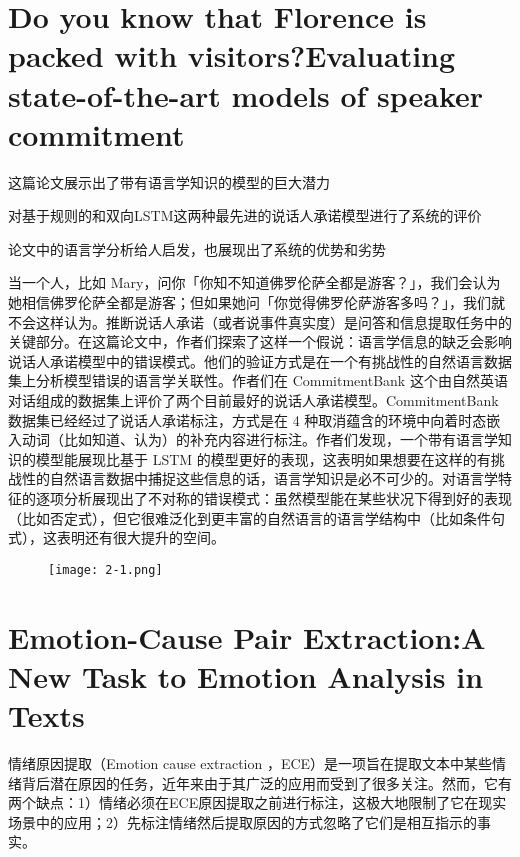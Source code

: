 \documentclass[a4paper,UTF8]{article}
\numberwithin{equation}{section}
\begin{document}
\newpage
\section{Do you know that Florence is packed with visitors?Evaluating state-of-the-art models of speaker commitment}
这篇论文展示出了带有语言学知识的模型的巨大潜力

对基于规则的和双向LSTM这两种最先进的说话人承诺模型进行了系统的评价

论文中的语言学分析给人启发，也展现出了系统的优势和劣势

当一个人，比如 Mary，问你「你知不知道佛罗伦萨全都是游客？」，我们会认为她相信佛罗伦萨全都是游客；但如果她问「你觉得佛罗伦萨游客多吗？」，我们就不会这样认为。推断说话人承诺（或者说事件真实度）是问答和信息提取任务中的关键部分。在这篇论文中，作者们探索了这样一个假说：语言学信息的缺乏会影响说话人承诺模型中的错误模式。他们的验证方式是在一个有挑战性的自然语言数据集上分析模型错误的语言学关联性。作者们在 CommitmentBank 这个由自然英语对话组成的数据集上评价了两个目前最好的说话人承诺模型。CommitmentBank 数据集已经经过了说话人承诺标注，方式是在 4 种取消蕴含的环境中向着时态嵌入动词（比如知道、认为）的补充内容进行标注。作者们发现，一个带有语言学知识的模型能展现比基于 LSTM 的模型更好的表现，这表明如果想要在这样的有挑战性的自然语言数据中捕捉这些信息的话，语言学知识是必不可少的。对语言学特征的逐项分析展现出了不对称的错误模式：虽然模型能在某些状况下得到好的表现（比如否定式），但它很难泛化到更丰富的自然语言的语言学结构中（比如条件句式），这表明还有很大提升的空间。

\begin{figure}[H]
	\centering
	\texttt{[image: 2-1.png]}
\end{figure}

\newpage
\section{Emotion-Cause Pair Extraction:A New Task to Emotion Analysis in Texts}
情绪原因提取（Emotion cause extraction ，ECE）是一项旨在提取文本中某些情绪背后潜在原因的任务，近年来由于其广泛的应用而受到了很多关注。然而，它有两个缺点：1）情绪必须在ECE原因提取之前进行标注，这极大地限制了它在现实场景中的应用；2）先标注情绪然后提取原因的方式忽略了它们是相互指示的事实。
\end{document}
